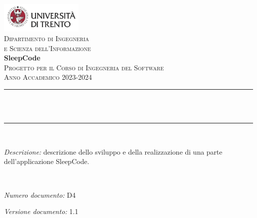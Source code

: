 \begin{titlepage}
\newcommand{\HRule}{\rule{\linewidth}{0.3mm}} %
\center %

\includegraphics[width=0.3\textwidth]{materiale/UniTrento_logo_ITA_colore.png}\\[0.5cm]
\textsc{\Large Dipartimento di Ingegneria\\e Scienza dell'Informazione}\\[1.5cm]

{\Huge\textbf{SleepCode}}\\[0.5cm]
\textsc{\large Progetto per il Corso di Ingegneria del Software}\\
\textsc{\large Anno Accademico 2023-2024}\\[0.5cm]


\HRule\\[0.4cm]
{\huge\bfseries \@title}\\[0.1cm]
\HRule\\[1cm]

\begin{minipage}{\textwidth}
\textit{Descrizione:} descrizione dello sviluppo e della realizzazione di una parte dell'applicazione SleepCode.
\end{minipage}\\[1.5cm]


\begin{minipage}{0.4\textwidth}
\begin{flushleft}
\large
\textit{Numero documento:} D4
\end{flushleft}
\end{minipage}
\begin{minipage}{0.4\textwidth}
\begin{flushright}
\large
\textit{Versione documento:} 1.1
\end{flushright}
\end{minipage}\\[1.5cm]


\end{titlepage}
